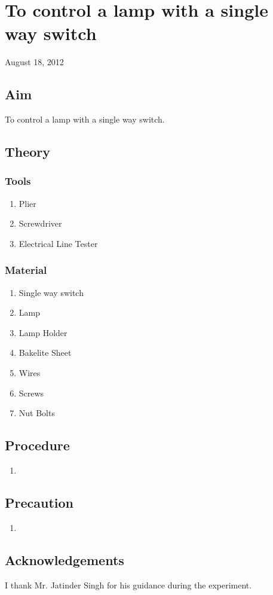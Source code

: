 \chapter{To control a lamp with a single way switch}
\begin{flushright}
August 18, 2012
\end{flushright}
\section{Aim}
To control a lamp with a single way switch.

\section{Theory}
	\subsection {Tools}
		\begin{enumerate}
			\item Plier
			\item Screwdriver
			\item Electrical Line Tester
		\end{enumerate}
	\subsection {Material}
		\begin{enumerate}
			\item Single way switch
			\item Lamp
			\item Lamp Holder
			\item Bakelite Sheet
			\item Wires
			\item Screws
			\item Nut Bolts
		\end{enumerate}
\section{Procedure}
	\begin{enumerate}
		\item 
	\end{enumerate}
\section{Precaution}
	\begin{enumerate}
		\item 
	\end{enumerate}
\section{Acknowledgements}
I thank Mr. Jatinder Singh for his guidance during the experiment.